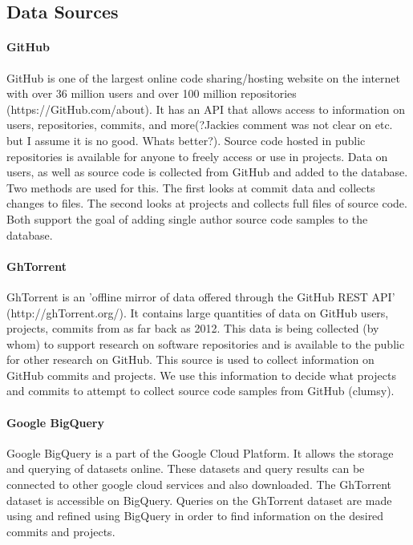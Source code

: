 \documentclass{article}
\begin{document}
\subsection{Data Sources}
\paragraph{GitHub}
GitHub is one of the largest online code sharing/hosting website on the internet with over 36 million users and over 100 million repositories (https://GitHub.com/about). It has an API that allows access to information on users, repositories, commits, and more(?Jackies comment was not clear on etc. but I assume it is no good. Whats better?). Source code hosted in public repositories is available for anyone to freely access or use in projects. Data on users, as well as source code is collected from GitHub and added to the database. Two methods are used for this. The first looks at commit data and collects changes to files. The second looks at projects and collects full files of source code. Both support the goal of adding single author source code samples to the database.

\paragraph{GhTorrent}
GhTorrent is an 'offline mirror of data offered through the GitHub REST API' (http://ghTorrent.org/). It contains large quantities of data on GitHub users, projects, commits from as far back as 2012. This data is being collected (by whom) to support research on software repositories and is available to the public for other research on GitHub. This source is used to collect information on GitHub commits and projects. We use this information to decide what projects and commits to attempt to collect source code samples from GitHub (clumsy).

\paragraph{Google BigQuery}
Google BigQuery is a part of the Google Cloud Platform. It allows the storage and querying of datasets online. These datasets and query results can be connected to other google cloud services and also downloaded. The GhTorrent dataset is accessible on BigQuery. Queries on the GhTorrent dataset are made  using and refined using BigQuery in order to find information on the desired commits and projects.
\end{document}
